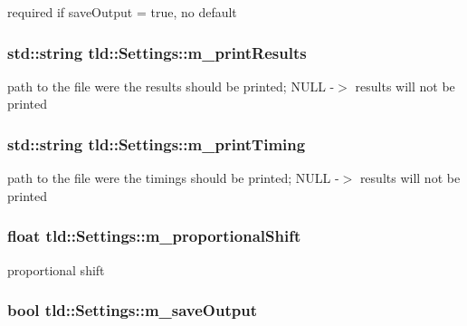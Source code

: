 required if saveOutput = true, no default 

\hypertarget{classtld_1_1_settings_a214e9008680cab432e095e5d07372dd1}{
\subsubsection[{m\_\-printResults}]{\setlength{\rightskip}{0pt plus 5cm}std::string {\bf tld::Settings::m\_\-printResults}}}
\label{classtld_1_1_settings_a214e9008680cab432e095e5d07372dd1}


path to the file were the results should be printed; NULL -\/$>$ results will not be printed 

\hypertarget{classtld_1_1_settings_af986bcadbc3f34693dd13191bbf65947}{
\subsubsection[{m\_\-printTiming}]{\setlength{\rightskip}{0pt plus 5cm}std::string {\bf tld::Settings::m\_\-printTiming}}}
\label{classtld_1_1_settings_af986bcadbc3f34693dd13191bbf65947}


path to the file were the timings should be printed; NULL -\/$>$ results will not be printed 

\hypertarget{classtld_1_1_settings_afcb52ecca38e4e236a66c3f36ec7cdbf}{
\subsubsection[{m\_\-proportionalShift}]{\setlength{\rightskip}{0pt plus 5cm}float {\bf tld::Settings::m\_\-proportionalShift}}}
\label{classtld_1_1_settings_afcb52ecca38e4e236a66c3f36ec7cdbf}


proportional shift 

\hypertarget{classtld_1_1_settings_a46de5897c9f1bc410c0f44f459181e05}{
\subsubsection[{m\_\-saveOutput}]{\setlength{\rightskip}{0pt plus 5cm}bool {\bf tld::Settings::m\_\-saveOutput}}}
\label{classtld_1_1_settings_a46de5897c9f1bc410c0f44f459181e05}


